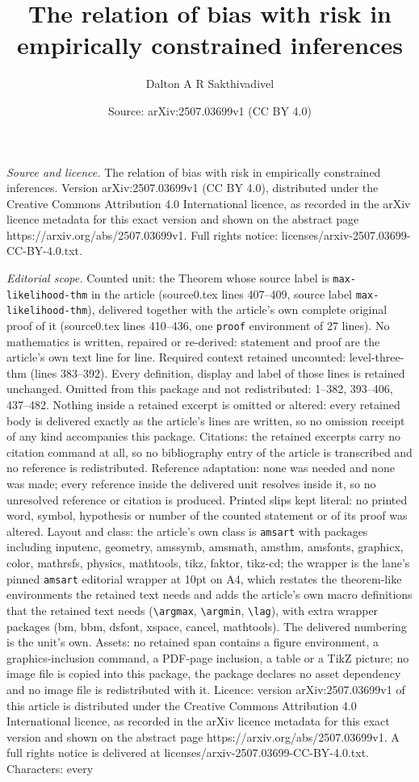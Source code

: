 \documentclass[10pt,a4paper]{amsart}
\title[The relation of bias with risk in empirically constrained in]{The relation of bias with risk in empirically constrained inferences}
\author{Dalton A R Sakthivadivel}
\date{Source: arXiv:2507.03699v1 (CC BY 4.0)}
\begin{document}
\maketitle

\noindent\emph{Source and licence.} The relation of bias with risk in empirically constrained inferences. Version arXiv:2507.03699v1 (CC BY 4.0), distributed under the Creative Commons Attribution 4.0 International licence, as recorded in the arXiv licence metadata for this exact version and shown on the abstract page https://arxiv.org/abs/2507.03699v1. Full rights notice: licenses/arxiv-2507.03699-CC-BY-4.0.txt.\par\smallskip

\noindent\textit{Editorial scope.} Counted unit: the Theorem whose source label is \texttt{max-likelihood-thm} in the article (source0.tex lines 407--409, source label \texttt{max-likelihood-thm}), delivered together with the article's own complete original proof of it (source0.tex lines 410--436, one \texttt{proof} environment of 27 lines). No mathematics is written, repaired or re-derived: statement and proof are the article's own text line for line. Required context retained uncounted: level-three-thm (lines 383--392). Every definition, display and label of those lines is retained unchanged. Omitted from this package and not redistributed: 1--382, 393--406, 437--482. Nothing inside a retained excerpt is omitted or altered: every retained body is delivered exactly as the article's lines are written, so no omission receipt of any kind accompanies this package. Citations: the retained excerpts carry no citation command at all, so no bibliography entry of the article is transcribed and no reference is redistributed. Reference adaptation: none was needed and none was made; every reference inside the delivered unit resolves inside it, so no unresolved reference or citation is produced. Printed slips kept literal: no printed word, symbol, hypothesis or number of the counted statement or of its proof was altered. Layout and class: the article's own class is \texttt{amsart} with packages including inputenc, geometry, amssymb, amsmath, amsthm, amsfonts, graphicx, color, mathrsfs, physics, mathtools, tikz, faktor, tikz-cd; the wrapper is the lane's pinned \texttt{amsart} editorial wrapper at 10pt on A4, which restates the theorem-like environments the retained text needs and adds the article's own macro definitions that the retained text needs (\texttt{\textbackslash argmax}, \texttt{\textbackslash argmin}, \texttt{\textbackslash lag}), with extra wrapper packages (bm, bbm, dsfont, xspace, cancel, mathtools). The delivered numbering is the unit's own. Assets: no retained span contains a figure environment, a graphics-inclusion command, a PDF-page inclusion, a table or a TikZ picture; no image file is copied into this package, the package declares no asset dependency and no image file is redistributed with it. Licence: version arXiv:2507.03699v1 of this article is distributed under the Creative Commons Attribution 4.0 International licence, as recorded in the arXiv licence metadata for this exact version and shown on the abstract page https://arxiv.org/abs/2507.03699v1. A full rights notice is delivered at licenses/arxiv-2507.03699-CC-BY-4.0.txt. Characters: every 
\end{document}
